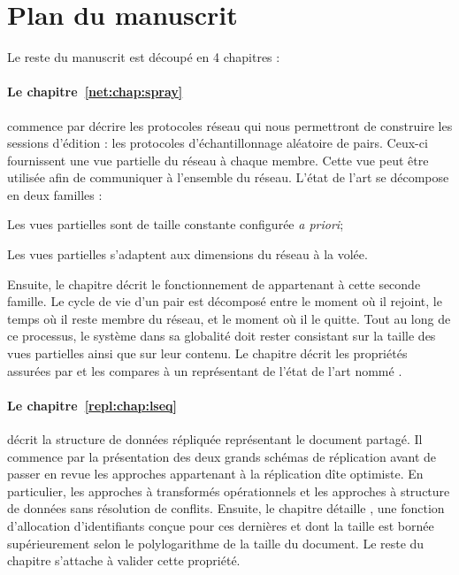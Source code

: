 
\section{Plan du manuscrit}

Le reste du manuscrit est découpé en 4 chapitres :


\paragraph{Le chapitre~\ref{net:chap:spray}} commence par décrire les protocoles
réseau qui nous permettront de construire les sessions d'édition : les
protocoles d'échantillonnage aléatoire de pairs. Ceux-ci fournissent une vue
partielle du réseau à chaque membre. Cette vue peut être utilisée afin de
communiquer à l'ensemble du réseau. L'état de l'art se décompose en deux
familles :
\begin{inparaenum}[(i)]
\item Les vues partielles sont de taille constante configurée \emph{a priori};
\item Les vues partielles s'adaptent aux dimensions du réseau à la volée.
\end{inparaenum}
Ensuite, le chapitre décrit le fonctionnement de \SPRAY appartenant à cette
seconde famille. Le cycle de vie d'un pair est décomposé entre le moment où il
rejoint, le temps où il reste membre du réseau, et le moment où il le
quitte. Tout au long de ce processus, le système dans sa globalité doit rester
consistant sur la taille des vues partielles ainsi que sur leur contenu.  Le
chapitre décrit les propriétés assurées par \SPRAY et les compares à un
représentant de l'état de l'art nommé \CYCLON.

\paragraph{Le chapitre~\ref{repl:chap:lseq}} décrit la structure de données
répliquée représentant le document partagé. Il commence par la présentation des
deux grands schémas de réplication avant de passer en revue les approches
appartenant à la réplication dîte optimiste. En particulier, les approches à
transformés opérationnels et les approches à structure de données sans
résolution de conflits. Ensuite, le chapitre détaille \LSEQ, une fonction
d'allocation d'identifiants conçue pour ces dernières et dont la taille est
bornée supérieurement selon le polylogarithme de la taille du document. Le reste
du chapitre s'attache à valider cette propriété.

